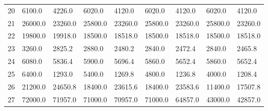\begin{tabular}{|r|l|l|l|l|l|l|l|l|}
  20 & 6100.0 & 4226.0 & 6020.0 & 4120.0 & 6020.0 & 4120.0 & 6020.0 & 4120.0 \\ 
  21 & 26000.0 & 23260.0 & 25800.0 & 23260.0 & 25800.0 & 23260.0 & 25800.0 & 23260.0 \\ 
  22 & 19800.0 & 19918.0 & 18500.0 & 18518.0 & 18500.0 & 18518.0 & 18500.0 & 18518.0 \\ 
  23 & 3260.0 & 2825.2 & 2880.0 & 2480.2 & 2840.0 & 2472.4 & 2840.0 & 2465.8 \\ 
  24 & 6080.0 & 5836.4 & 5900.0 & 5696.4 & 5860.0 & 5652.4 & 5860.0 & 5652.4 \\ 
  25 & 6400.0 & 1293.0 & 5400.0 & 1269.8 & 4800.0 & 1236.8 & 4000.0 & 1208.4 \\ 
  26 & 21200.0 & 24650.8 & 18400.0 & 23615.6 & 18400.0 & 23583.6 & 11400.0 & 17507.8 \\ 
  27 & 72000.0 & 71957.0 & 71000.0 & 70957.0 & 71000.0 & 64857.0 & 43000.0 & 42857.0 \\ 
\end{tabular}
